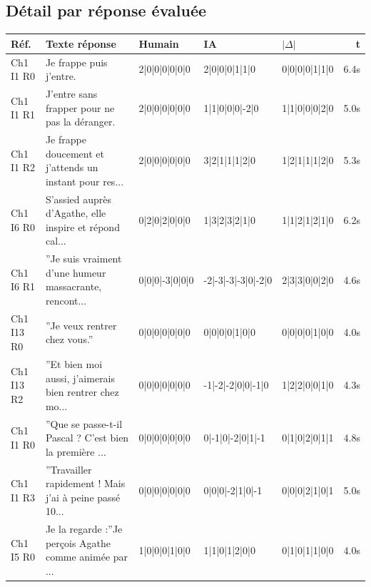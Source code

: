 \subsection{D\'etail par r\'eponse \'evalu\'ee}

\begin{longtable}{p{1.4cm} p{3.6cm} p{2.5cm} p{2.5cm} p{2.5cm} r}
\toprule
\textbf{R\'ef.} & \textbf{Texte r\'eponse} & \textbf{Humain} & \textbf{IA} & \textbf{$|\Delta|$} & \textbf{t} \\
\midrule
\endhead

Ch1 I1 R0 & \scriptsize{Je frappe puis j'entre.} & \scriptsize{2|0|0|0|0|0|0} & \scriptsize{2|0|0|0|1|1|0} & \scriptsize{0|0|0|0|1|1|0} & 6.4s \\
Ch1 I1 R1 & \scriptsize{J'entre sans frapper pour ne pas la déranger.} & \scriptsize{2|0|0|0|0|0|0} & \scriptsize{1|1|0|0|0|-2|0} & \scriptsize{1|1|0|0|0|2|0} & 5.0s \\
Ch1 I1 R2 & \scriptsize{Je frappe doucement et j'attends un instant pour res...} & \scriptsize{2|0|0|0|0|0|0} & \scriptsize{3|2|1|1|1|2|0} & \scriptsize{1|2|1|1|1|2|0} & 5.3s \\
Ch1 I6 R0 & \scriptsize{S'assied auprès d'Agathe, elle inspire et répond cal...} & \scriptsize{0|2|0|2|0|0|0} & \scriptsize{1|3|2|3|2|1|0} & \scriptsize{1|1|2|1|2|1|0} & 6.2s \\
Ch1 I6 R1 & \scriptsize{''Je suis vraiment d'une humeur massacrante, rencont...} & \scriptsize{0|0|0|-3|0|0|0} & \scriptsize{-2|-3|-3|-3|0|-2|0} & \scriptsize{2|3|3|0|0|2|0} & 4.6s \\
Ch1 I13 R0 & \scriptsize{''Je veux rentrer chez vous.''} & \scriptsize{0|0|0|0|0|0|0} & \scriptsize{0|0|0|0|1|0|0} & \scriptsize{0|0|0|0|1|0|0} & 4.0s \\
Ch1 I13 R2 & \scriptsize{''Et bien moi aussi, j'aimerais bien rentrer chez mo...} & \scriptsize{0|0|0|0|0|0|0} & \scriptsize{-1|-2|-2|0|0|-1|0} & \scriptsize{1|2|2|0|0|1|0} & 4.3s \\
Ch1 I1 R0 & \scriptsize{''Que se passe-t-il Pascal ? C'est bien la première ...} & \scriptsize{0|0|0|0|0|0|0} & \scriptsize{0|-1|0|-2|0|1|-1} & \scriptsize{0|1|0|2|0|1|1} & 4.8s \\
Ch1 I1 R3 & \scriptsize{''Travailler rapidement ! Mais j'ai à peine passé 10...} & \scriptsize{0|0|0|0|0|0|0} & \scriptsize{0|0|0|-2|1|0|-1} & \scriptsize{0|0|0|2|1|0|1} & 5.0s \\
Ch1 I5 R0 & \scriptsize{Je la regarde :''Je perçois Agathe comme animée par ...} & \scriptsize{1|0|0|0|1|0|0} & \scriptsize{1|1|0|1|2|0|0} & \scriptsize{0|1|0|1|1|0|0} & 4.0s \\

\end{longtable}
